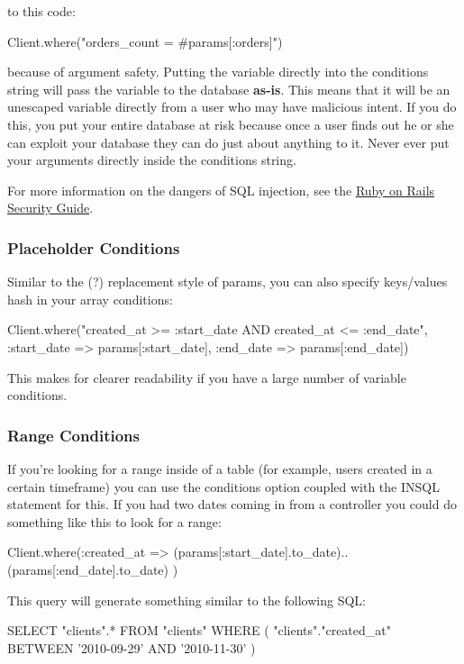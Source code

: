 \documentclass[10pt]{book}
\newenvironment{code}{%
  \scriptsize
    \verbatim
}{%
    \endverbatim
    \newline
}
\begin{document}
to this code:
\begin{code}
Client.where("orders_count = #{params[:orders]}")
\end{code}

because of argument safety. Putting the variable directly into the conditions string will pass the variable to the database \textbf{as-is}.  This means that it will be an unescaped variable directly from a user  who may have malicious intent. If you do this, you put your entire  database at risk because once a user finds out he or she can exploit  your database they can do just about anything to it. Never ever put your  arguments directly inside the conditions string.

For more information on the dangers of SQL injection, see the \href{http://guides.rubyonrails.org/security.html#sql-injection}{Ruby on Rails Security Guide}.

\subsubsection{ Placeholder Conditions}

Similar to the (?) replacement style of params, you can also specify keys/values hash in your array conditions:
\begin{code}
Client.where("created_at >= :start_date AND created_at <= :end_date",
  {:start_date => params[:start_date], :end_date => params[:end_date]})
\end{code}

This makes for clearer readability if you have a large number of variable conditions.

\subsubsection{ Range Conditions}

If you’re looking for a range inside of a table (for example, users  created in a certain timeframe) you can use the conditions option  coupled with the INSQL statement for this. If you had two dates coming in from a controller you could do something like this to look for a range:
\begin{code}
Client.where(:created_at => 
(params[:start_date].to_date)..(params[:end_date].to_date)
)
\end{code}

This query will generate something similar to the following SQL:
\begin{code}
SELECT "clients".* FROM "clients" WHERE (
"clients"."created_at" BETWEEN '2010-09-29' AND '2010-11-30'
)
\end{code}
\end{document}
